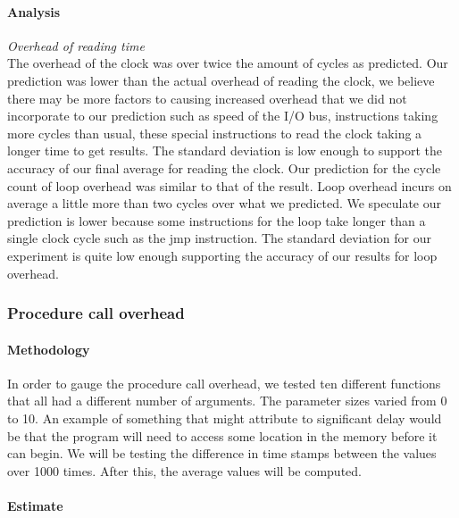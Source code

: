 \paragraph{Analysis}

 \textit{Overhead of reading time}\\
 The overhead of the clock was over twice the amount of cycles as predicted. Our prediction was lower than the actual overhead of reading the clock, we believe there may be more factors to causing increased overhead that we did not incorporate to our prediction such as speed of the I/O bus, instructions taking more cycles than usual, these special instructions to read the clock taking a longer time to get results. The standard deviation is low enough to support the accuracy of our final average for reading the clock. Our prediction for the cycle count of loop overhead was similar to that of the result. Loop overhead incurs on average a little more than two cycles over what we predicted. We speculate our prediction is lower because some instructions for the loop take longer than a single clock cycle such as the jmp instruction. The standard deviation for our experiment is quite low enough supporting the accuracy of our results for loop overhead.

\subsubsection{Procedure call overhead}


\paragraph{Methodology}

In order to gauge the procedure call overhead, we tested ten different functions that all had a different number of arguments. The parameter sizes varied from 0 to 10. An example of something that might attribute to significant delay would be that the program will need to access some location in the memory before it can begin. We will be testing the difference in time stamps between the values over 1000 times. After this, the average values will be computed. %

\paragraph{Estimate}

